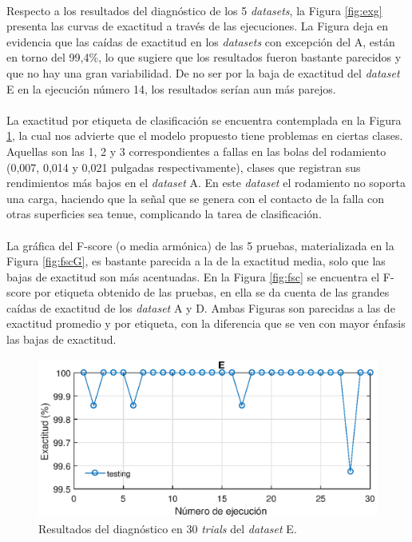 \documentclass[12pt]{article}%
\begin{document}
\paragraph{}
Respecto a los resultados del diagnóstico de los 5 \textit{datasets}, la Figura \ref{fig:exg} presenta las curvas de exactitud a través de las ejecuciones. La Figura deja en evidencia que las caídas de exactitud en los \textit{datasets} con excepción del A, están en torno del 99,4\%, lo que sugiere que los resultados fueron bastante parecidos y que no hay una gran variabilidad. De no ser por la baja de exactitud del \textit{dataset} E en la ejecución número 14, los resultados serían aun más parejos.

\paragraph{}
La exactitud por etiqueta de clasificación se encuentra contemplada en la Figura \ref{fig:accge}, la cual nos advierte que el modelo propuesto tiene problemas en ciertas clases. Aquellas son las 1, 2 y 3 correspondientes a fallas en las bolas del rodamiento (0,007, 0,014 y 0,021 pulgadas respectivamente), clases que registran sus rendimientos más bajos en el \textit{dataset} A. En este \textit{dataset} el rodamiento no soporta una carga, haciendo que la señal que se genera con el contacto de la falla con otras superficies sea tenue, complicando la tarea de clasificación.

\paragraph{}
La gráfica del F-score (o media armónica) de las 5 pruebas, materializada en la Figura \ref{fig:fscG}, es bastante parecida a la de la exactitud media, solo que las bajas de exactitud son más acentuadas. En la Figura \ref{fig:fsc} se encuentra el F-score por etiqueta obtenido de las pruebas, en ella se da cuenta de las grandes caídas de exactitud de los \textit{dataset} A y D. Ambas Figuras son parecidas a las de exactitud promedio y por etiqueta, con la diferencia que se ven con mayor énfasis las bajas de exactitud. 


\begin{figure}[ht]
  \centering
    \includegraphics[scale=0.9]{./AccGE.eps}
  \caption{Resultados del diagnóstico en 30 \textit{trials} del \textit{dataset} E.}
  \label{fig:accge}
\end{figure}
\end{document}
